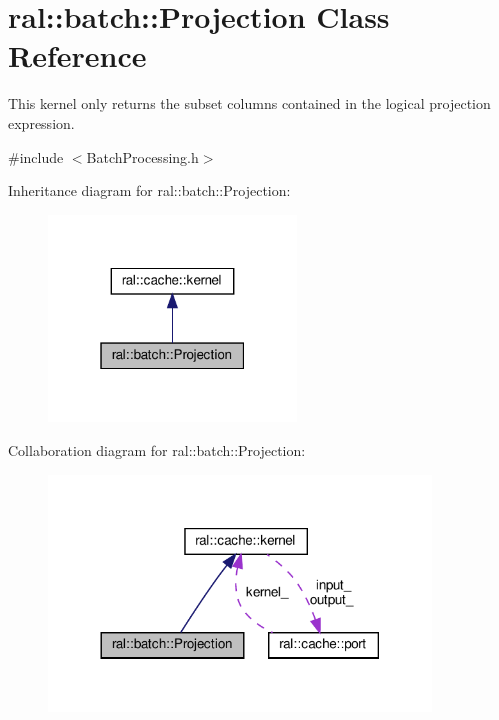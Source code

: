 \hypertarget{classral_1_1batch_1_1Projection}{}\section{ral\+:\+:batch\+:\+:Projection Class Reference}
\label{classral_1_1batch_1_1Projection}


This kernel only returns the subset columns contained in the logical projection expression.  




{\ttfamily \#include $<$Batch\+Processing.\+h$>$}



Inheritance diagram for ral\+:\+:batch\+:\+:Projection\+:\nopagebreak
\begin{figure}[H]
\begin{center}
\leavevmode
\includegraphics[width=187pt]{classral_1_1batch_1_1Projection__inherit__graph}
\end{center}
\end{figure}


Collaboration diagram for ral\+:\+:batch\+:\+:Projection\+:\nopagebreak
\begin{figure}[H]
\begin{center}
\leavevmode
\includegraphics[width=288pt]{classral_1_1batch_1_1Projection__coll__graph}
\end{center}
\end{figure}
